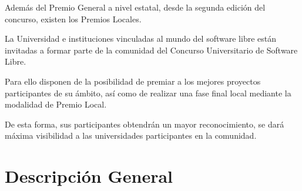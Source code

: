 Además del Premio General a nivel estatal, desde la segunda edición del
concurso, existen los Premios Locales.

La Universidad e instituciones vinculadas al mundo del software libre están
invitadas a formar parte de la comunidad del Concurso Universitario de Software
Libre.

Para ello disponen de la posibilidad de premiar a los mejores proyectos
participantes de su ámbito, así como de realizar una fase final local mediante
la modalidad de Premio Local.

De esta forma, sus participantes obtendrán un mayor reconocimiento, se dará
máxima visibilidad a las universidades participantes en la comunidad.

\section{Descripción General}


